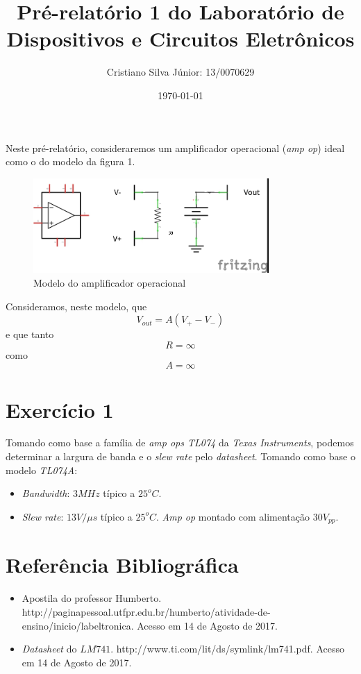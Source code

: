 \documentclass[12pt, a4paper, twoside]{article}
\begin{document}
\title{Pré-relatório 1 do Laboratório de Dispositivos e Circuitos Eletrônicos}
\author{Cristiano Silva Júnior: 13/0070629}
\date{\today}
\maketitle

Neste pré-relatório, consideraremos um amplificador operacional (\textit{amp op}) ideal como o do modelo da figura 1.

\begin{figure}
    \centering
    \includegraphics[width=0.8\textwidth]{figs/ex0.jpg}
    \caption{Modelo do amplificador operacional}
\end{figure}

Consideramos, neste modelo, que
$$ V_{out} = A (V_+ - V_-) $$
e que tanto
$$ R = \infty $$
como
$$ A = \infty $$

\section{Exercício 1}

Tomando como base a família de \textit{amp ops TL074} da \textit{Texas Instruments}, podemos determinar a largura de banda e o \textit{slew rate} pelo \textit{datasheet}. Tomando como base o modelo \textit{TL074A}:

\begin{itemize}
    \item \textit{Bandwidth}: $3MHz$ típico a $25^oC$.
    \item \textit{Slew rate}: $13 V/\mu s$ típico a $25^oC$. \textit{Amp op} montado com alimentação $30V_{pp}$.
\end{itemize}



\section{Referência Bibliográfica}

\begin{itemize}
    \item Apostila do professor Humberto. http://paginapessoal.utfpr.edu.br/humberto/atividade-de-ensino/inicio/labeltronica. Acesso em 14 de Agosto de 2017.
    \item \textit{Datasheet} do $LM741$. http://www.ti.com/lit/ds/symlink/lm741.pdf. Acesso em 14 de Agosto de 2017.
\end{itemize}
\end{document}
